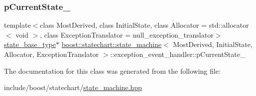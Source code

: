 \mbox{\label{classboost_1_1statechart_1_1state__machine_1_1exception__event__handler_a215e864f3ab619e4ab2ed7fa73e28dbe}} 
\subsubsection{\texorpdfstring{p\+Current\+State\+\_\+}{pCurrentState\_}}
{\footnotesize\ttfamily template$<$class Most\+Derived, class Initial\+State, class Allocator = std\+::allocator$<$ void $>$, class Exception\+Translator = null\+\_\+exception\+\_\+translator$>$ \\
\mbox{\hyperlink{classboost_1_1statechart_1_1state__machine_a69cc258c29fcabec25c5dc8bedb7d530}{state\+\_\+base\+\_\+type}}$\ast$ \mbox{\hyperlink{classboost_1_1statechart_1_1state__machine}{boost\+::statechart\+::state\+\_\+machine}}$<$ Most\+Derived, Initial\+State, Allocator, Exception\+Translator $>$\+::exception\+\_\+event\+\_\+handler\+::p\+Current\+State\+\_\+\hspace{0.3cm}{\ttfamily [private]}}



The documentation for this class was generated from the following file\+:\begin{DoxyCompactItemize}
\item 
include/boost/statechart/\mbox{\hyperlink{state__machine_8hpp}{state\+\_\+machine.\+hpp}}\end{DoxyCompactItemize}
